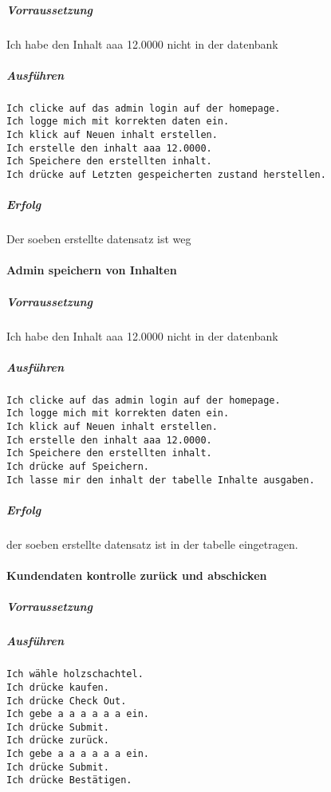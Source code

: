 \documentclass[a4paper, 11pt]{article}
\begin{document}
\subparagraph{Vorraussetzung}

Ich habe den Inhalt aaa 12.0000 nicht in der datenbank

\subparagraph{Ausführen}

\begin{verbatim}
Ich clicke auf das admin login auf der homepage.
Ich logge mich mit korrekten daten ein.
Ich klick auf Neuen inhalt erstellen.
Ich erstelle den inhalt aaa 12.0000.
Ich Speichere den erstellten inhalt.
Ich drücke auf Letzten gespeicherten zustand herstellen.
\end{verbatim}

\subparagraph{Erfolg}

Der soeben erstellte datensatz ist weg

\paragraph{Admin speichern von Inhalten}

\subparagraph{Vorraussetzung}

Ich habe den Inhalt aaa 12.0000 nicht in der datenbank

\subparagraph{Ausführen}

\begin{verbatim}
Ich clicke auf das admin login auf der homepage.
Ich logge mich mit korrekten daten ein.
Ich klick auf Neuen inhalt erstellen.
Ich erstelle den inhalt aaa 12.0000.
Ich Speichere den erstellten inhalt.
Ich drücke auf Speichern.
Ich lasse mir den inhalt der tabelle Inhalte ausgaben.
\end{verbatim}

\subparagraph{Erfolg}

der soeben erstellte datensatz ist in der tabelle eingetragen.

\paragraph{Kundendaten kontrolle zurück und abschicken}

\subparagraph{Vorraussetzung}

\subparagraph{Ausführen}

\begin{verbatim}
Ich wähle holzschachtel.
Ich drücke kaufen.
Ich drücke Check Out.
Ich gebe a a a a a a ein.
Ich drücke Submit.
Ich drücke zurück.
Ich gebe a a a a a a ein.
Ich drücke Submit.
Ich drücke Bestätigen.
\end{verbatim}
\end{document}
